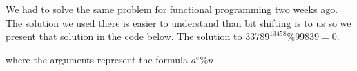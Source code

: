 We had to solve the same problem for functional programming two weeks ago. The solution we used there is easier to understand than bit shifting is to us so we present that solution in the code below. The solution to $33789^{13458} \% 99839 = 0$.



where the arguments represent the formula $a^e \% n$.